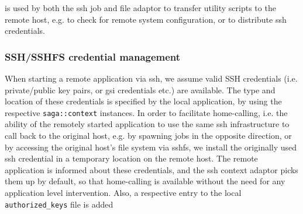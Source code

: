 \documentclass[conference,final]{IEEEtran}
\newcommand{\upp}{\vspace*{-0.5em}}
\newcommand{\T}[1]{\texttt{#1}}
\newcommand{\scp}[1]{\texttt{scp}}
\newcommand{\sshfs}[1]{\texttt{sshfs}}
\begin{document}
{\texttt{\scp}} is used by both the ssh job and file adaptor to
transfer utility scripts to the remote host, e.g. to check for remote
system configuration, or to distribute ssh credentials.

\subsubsection{SSH/SSHFS credential management}

When starting a remote application via ssh, we assume valid SSH
credentials (i.e. private/public key pairs, or gsi credentials etc.)
are available.  The type and location of these credentials is
specified by the local application, by using the respective
\T{saga::context} instances.  In order to facilitate home-calling,
i.e. the ability of the remotely started application to use the same
ssh infrastructure to call back to the original host, e.g. by spawning
jobs in the opposite direction, or by accessing the original host's
file system via sshfs, we install the originally used ssh credential
in a temporary location on the remote host. The remote application is
informed about these credentials, and the ssh context adaptor picks
them up by default, so that home-calling is available without the need
for any application level intervention.  Also, a respective entry to
the local \T{authorized\_keys} file is added%




\end{document}
